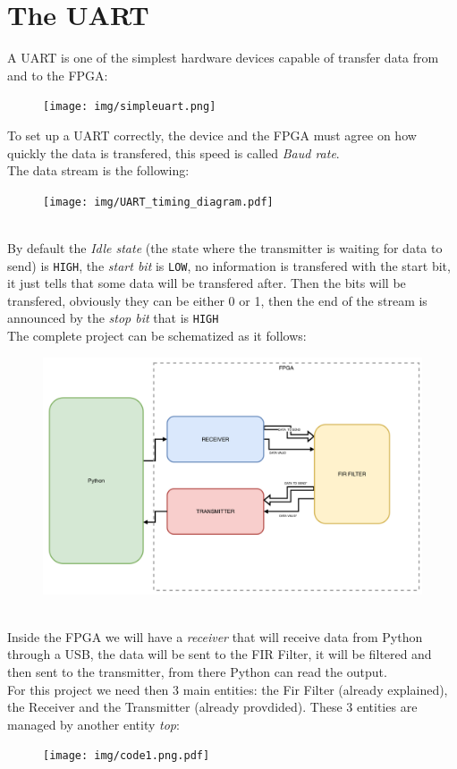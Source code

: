\documentclass[11pt,a4paper,twocolumn]{IEEEtran}
\begin{document}
	\section{The UART}
	A UART is one of the simplest hardware devices capable of transfer data from and to the FPGA:
	\begin{figure}[h]
		\centering
		\texttt{[image: img/simpleuart.png]}
	\end{figure}
	To set up a UART correctly, the device and the FPGA must agree on how quickly the data is transfered, this speed is called \emph{Baud rate}.\\
	The data stream is the following:
	\begin{figure}[h]
		\centering
		\texttt{[image: img/UART\_timing\_diagram.pdf]}
	\end{figure}\\
	By default the \emph{Idle state} (the state where the transmitter is waiting for data to send) is \texttt{HIGH}, the \emph{start bit} is \texttt{LOW}, no information is transfered with the start bit, it just tells that some data will be transfered after. Then the bits will be transfered, obviously they can be either 0 or 1, then the end of the stream is announced by the \emph{stop bit} that is \texttt{HIGH}\medskip\\
	The complete project can be schematized as it follows:
	\begin{figure}[h]
		\centering
		\includegraphics[width=1\linewidth]{img/projectcomplete}
	\end{figure}\\
	Inside the FPGA we will have a \emph{receiver} that will receive data from Python through a USB, the data will be sent to the FIR Filter, it will be filtered and then sent to the transmitter, from there Python can read the output.\\
	For this project we need then 3 main entities: the Fir Filter (already explained), the Receiver and the Transmitter (already provdided). These 3 entities are managed by another entity \emph{top}:
	\begin{figure}[h]
		\centering
		\hspace*{-.8cm}\texttt{[image: img/code1.png.pdf]}
	\end{figure}
	
\end{document}
